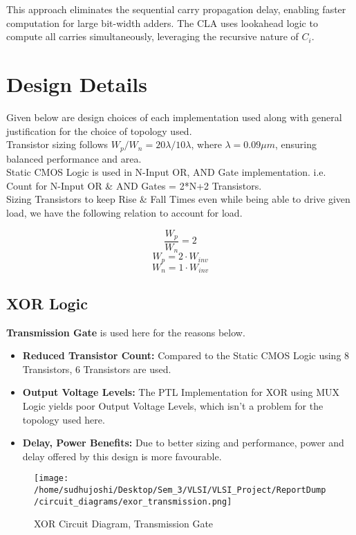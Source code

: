\documentclass[conference]{IEEEtran}
\begin{document}
This approach eliminates the sequential carry propagation delay, enabling faster computation for large bit-width adders. The CLA uses lookahead logic to compute all carries simultaneously, leveraging the recursive nature of $C_i$.
\section{Design Details}
Given below are design choices of each implementation used along with general justification for the choice of topology used.
\\
Transistor sizing follows \( W_p/W_n = 20\lambda/10\lambda \), where \( \lambda = 0.09\mu m \), 
ensuring balanced performance and area.
\\ 
Static CMOS Logic is used in N-Input OR, AND Gate implementation. i.e.
\\
Count for N-Input OR \& AND Gates = 2*N+2 Transistors.
\\
Sizing Transistors to keep Rise \& Fall Times even while being able to drive given load, 
we have the following relation to account for load.

\[
\frac{W_{p}}{W_{n}} = 2
\]
\[
W_{p} = 2\cdot W_{inv}
\]
\[
W_{n} = 1\cdot W_{inv}
\]



\subsection{XOR Logic}
\textbf{Transmission Gate} is used here for the reasons below.
\begin{itemize}
\item \textbf{Reduced Transistor Count:} Compared to the Static CMOS Logic using 8 Transistors, 6 Transistors are used.
\item \textbf{Output Voltage Levels:} The PTL Implementation for XOR using MUX Logic yields poor Output Voltage Levels, which isn't a problem for the topology used here.
\item \textbf{Delay, Power Benefits:} Due to better sizing and performance, power and delay offered by this design is more favourable.
\end{itemize}

\begin{figure}[H] 
    \centering
    \texttt{[image: /home/sudhujoshi/Desktop/Sem\_3/VLSI/VLSI\_Project/ReportDump/circuit\_diagrams/exor\_transmission.png]}
    \caption{XOR Circuit Diagram, Transmission Gate} 
\end{figure}
\end{document}
